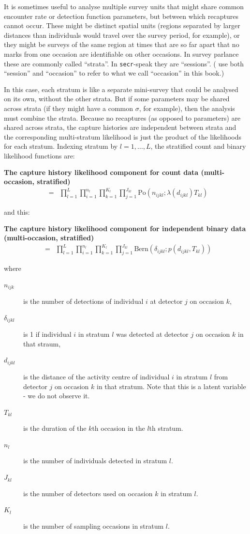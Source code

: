 \documentclass[graybox,envcountchap,sectrefs]{SpringerStyleFiles/styles/svmono}\usepackage[]{graphicx}\usepackage[]{color}
\newcommand{\be}{\begin{eqnarray}}
\newcommand{\ee}{\end{eqnarray}}
\newcommand{\bd}{\begin{description}}
\newcommand{\ed}{\end{description}}
\begin{document}
It is sometimes useful to analyse multiple survey units that might share common encounter rate or detection function parameters, but between which recaptures cannot occur. These might be distinct spatial units (regions separated by larger distances than individuals would travel over the survey period, for example), or they might be surveys of the same region at times that are so far apart that no marks from one occasion are identifiable on other occasions. In survey parlance these are commonly called ``strata''. In \texttt{secr}-speak they are ``sessions''. (\cite{Royle+al:14} use both ``session'' and ``occasion'' to refer to what we call ``occasion'' in this book.)

In this case, each stratum is like a separate mini-survey that could be analysed on its own, without the other strata. But if some parameters may be shared across strata (if they might have a common $\sigma$, for example), then the analysis must combine the strata. Because no recaptures (as opposed to parameters) are shared across strata, the capture histories are independent between strata and the corresponding multi-stratum likelihood is just the product of the likelihoods for each stratum. Indexing stratum by $l=1,\ldots,L$, the stratified count and binary likelihood functions are:
\begin{svgraybox}
\bf{The capture history likelihood component for count data (multi-occasion, stratified)}
\be
[\bm{\Omega}_n|\bm{S}_n]&=&\prod_{l=1}^L\prod_{i=1}^{n_l}\prod_{k=1}^{K_l}\prod_{j=1}^{J_{kl}}\mbox{Po}\left(n_{ijkl};\lambda(d_{ijkl})T_{kl}\right)
\label{eq:ER+detfun.P.Omega.count.occ.strat}
\ee
\end{svgraybox}
and this:
\begin{svgraybox}
\bf{The capture history likelihood component for independent binary data (multi-occasion, stratified)}
\be
[\bm{\Omega}_n|\bm{S}_n]&=&\prod_{l=1}^L\prod_{i=1}^{n_l}\prod_{k=1}^{K_l}\prod_{j=1}^{J_{kl}}\mbox{Bern}\left(\delta_{ijkl};p(d_{ijkl},T_{kl})\right)
\label{eq:ER+detfun.P.Omega.binary.occ.strat}
\ee
\end{svgraybox}
\noindent
where
\begin{svgraybox}
\bd
\item[$n_{ijk}$] is the number of detections of individual $i$ at detector $j$ on occasion $k$,
\item[$\delta_{ijkl}$] is 1 if individual $i$ in stratum $l$ was detected at detector $j$ on occasion $k$ in that straum,
\item[$d_{ijkl}$] is the distance of the activity centre of individual $i$ in stratum $l$ from detector $j$ on occasion $k$ in that stratum. Note that this is a latent variable - we do not observe it.
\item[$T_{kl}$] is the duration of the $k$th occasion in the $l$th stratum.
\item[$n_l$] is the number of individuals detected in stratum $l$.
\item[$J_{kl}$] is the number of detectors used on occasion $k$ in stratum $l$.
\item[$K_l$] is the number of sampling occasions in stratum $l$.
\ed
\end{svgraybox}
\end{document}
